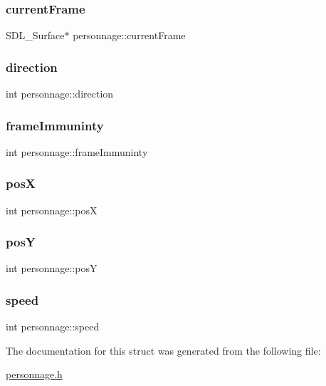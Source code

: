 \subsubsection{\texorpdfstring{current\+Frame}{currentFrame}}
{\footnotesize\ttfamily S\+D\+L\+\_\+\+Surface$\ast$ personnage\+::current\+Frame}

\mbox{\label{structpersonnage_a2664acffa6fccd8487b9e03b63fbd6da}} 
\subsubsection{\texorpdfstring{direction}{direction}}
{\footnotesize\ttfamily int personnage\+::direction}

\mbox{\label{structpersonnage_ab7d66f8290fd0a548b7fe4c521f75e1d}} 
\subsubsection{\texorpdfstring{frame\+Immuninty}{frameImmuninty}}
{\footnotesize\ttfamily int personnage\+::frame\+Immuninty}

\mbox{\label{structpersonnage_a6f803343f258e12f2c7127b405ff7ecb}} 
\subsubsection{\texorpdfstring{posX}{posX}}
{\footnotesize\ttfamily int personnage\+::posX}

\mbox{\label{structpersonnage_afa542266546b567ffcaa7ead5dd0d3b5}} 
\subsubsection{\texorpdfstring{posY}{posY}}
{\footnotesize\ttfamily int personnage\+::posY}

\mbox{\label{structpersonnage_acb8e0ece93e2c7c15a1672e2867edc19}} 
\subsubsection{\texorpdfstring{speed}{speed}}
{\footnotesize\ttfamily int personnage\+::speed}



The documentation for this struct was generated from the following file\+:\begin{DoxyCompactItemize}
\item 
\hyperlink{personnage_8h}{personnage.\+h}\end{DoxyCompactItemize}
